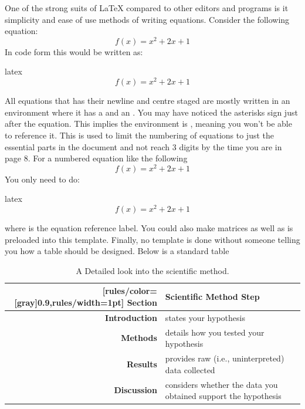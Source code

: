 \documentclass[minted, draw]{../tex/hebdomon}
\begin{document}
%
One of the strong suits of LaTeX compared to other editors and programs is
it simplicity and ease of use methods of writing equations. Consider the
following equation:
%
\begin{equation*}
	f(x) = x^2 + 2x + 1
\end{equation*}
%
In code form this would be written as:
%
\begin{code}{latex}
	\begin{equation*}
		f(x) = x^2 + 2x + 1
	\end{equation*}
\end{code}
%
All equations that has their newline and centre staged are mostly written
in an environment where it has a  and an . You may
have noticed the asterisks sign just after the equation. This implies the
environment is , meaning you won't be able to
reference it. This is used to limit the numbering of equations to just the
essential parts in the document and not reach 3 digits by the time you are
in page 8. For a numbered equation like the following
%
\begin{equation}
	f(x) = x^2 + 2x + 1
\end{equation}
%
You only need to do:
%
\begin{code}{latex}
	\begin{equation}\label{eq:quad}
		f(x) = x^2 + 2x + 1
	\end{equation}
\end{code}
% 
where \pcode{\label{eq:quad}} is the equation reference label.
%
You could also make matrices as well as  is preloaded into this template.
%
%
Finally, no template is done without someone telling you how a table should be designed.
%
Below is a standard table
%
\begin{table}[!ht]
	\begin{NiceTabular}{rX}[rules/color=[gray]{0.9},rules/width=1pt]
		\CodeBefore
		\Body
		\toprule
		\textbf{Section}      & \textbf{Scientific Method Step}                                \\
		\midrule
		\textbf{Introduction} & states your hypothesis                                         \\
		\textbf{Methods}      & details how you tested your hypothesis                         \\
		\textbf{Results}      & provides raw (i.e., uninterpreted) data collected              \\
		\textbf{Discussion}   & considers whether the data you obtained support the hypothesis \\
		\bottomrule
	\end{NiceTabular}
	\caption{A Detailed look into the scientific method.}
\end{table}
\end{document}
